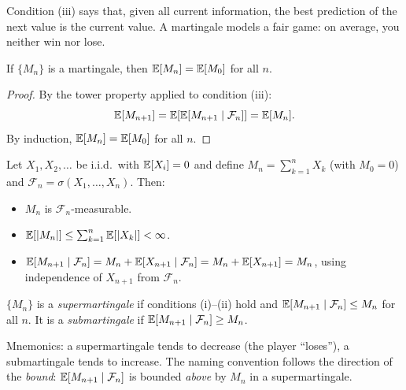\documentclass[11pt,a4paper]{article}
\begin{document}
\begin{remark}[Interpretation]
Condition (iii) says that, given all current information, the
best prediction of the next value is the current value.  A
martingale models a fair game: on average, you neither win nor
lose.
\end{remark}

\begin{proposition}
\label{prop:martingale_const_mean}
If $\{M_n\}$ is a martingale, then $\mathbb{E}[M_n] = \mathbb{E}[M_0]$ for all
$n$.
\end{proposition}

\begin{proof}
By the tower property applied to condition (iii):
\[
  \mathbb{E}[M_{n+1}] = \mathbb{E}[\mathbb{E}[M_{n+1} \mid \mathcal{F}_n]]
  = \mathbb{E}[M_n].
\]
By induction, $\mathbb{E}[M_n] = \mathbb{E}[M_0]$ for all $n$.
\end{proof}

\begin{example}
\label{ex:random_walk}
Let $X_1, X_2, \ldots$ be i.i.d.\ with $\mathbb{E}[X_i] = 0$ and
define $M_n = \sum_{k=1}^n X_k$ (with $M_0 = 0$) and
$\mathcal{F}_n = \sigma(X_1, \ldots, X_n)$.  Then:
\begin{itemize}[nosep]
  \item $M_n$ is $\mathcal{F}_n$-measurable.
  \item $\mathbb{E}[|M_n|] \leq \sum_{k=1}^n \mathbb{E}[|X_k|] < \infty$.
  \item $\mathbb{E}[M_{n+1} \mid \mathcal{F}_n]
    = M_n + \mathbb{E}[X_{n+1} \mid \mathcal{F}_n]
    = M_n + \mathbb{E}[X_{n+1}] = M_n$,
    using independence of $X_{n+1}$ from $\mathcal{F}_n$.
\end{itemize}
\end{example}

\begin{definition}
\label{def:super_sub}
$\{M_n\}$ is a \emph{supermartingale} if conditions (i)--(ii)
hold and $\mathbb{E}[M_{n+1} \mid \mathcal{F}_n] \leq M_n$ for all $n$.
It is a \emph{submartingale} if
$\mathbb{E}[M_{n+1} \mid \mathcal{F}_n] \geq M_n$.
\end{definition}

\begin{remark}
Mnemonics: a supermartingale tends to decrease (the player
``loses''), a submartingale tends to increase.  The naming
convention follows the direction of the \emph{bound}:
$\mathbb{E}[M_{n+1} \mid \mathcal{F}_n]$ is bounded \emph{above} by
$M_n$ in a supermartingale.
\end{remark}
\end{document}
